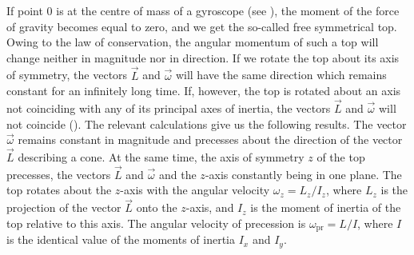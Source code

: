 If point $0$ is at the centre of mass of a gyroscope (see ), the moment of the force of gravity becomes equal to zero, and we get the so-called free symmetrical top. Owing to the law of conservation, the angular momentum of such a top will change neither in magnitude nor in direction. If we rotate the top about its axis of symmetry, the vectors $\vec{L}$ and $\vec{\omega}$ will have the same direction which remains constant for an infinitely long time. If, however, the top is rotated about an axis not coinciding with any of its principal axes of inertia, the vectors $\vec{L}$ and $\vec{\omega}$ will not coincide (). The relevant calculations give us the following results. The vector $\vec{\omega}$ remains constant in magnitude and precesses about the direction of the vector $\vec{L}$ describing a cone. At the same time, the axis of symmetry $z$ of the top precesses, the vectors $\vec{L}$ and $\vec{\omega}$ and the $z$-axis constantly being in one plane. The top rotates about the $z$-axis with the angular velocity $\omega_z=L_z/I_z$, where $L_z$ is the projection of the vector $\vec{L}$ onto the $z$-axis, and $I_z$ is the moment of inertia of the top relative to this axis. The angular velocity of precession is $\omega_{\text{pr}}=L/I$, where $I$ is the identical value of the moments of inertia $I_x$ and $I_y$.

